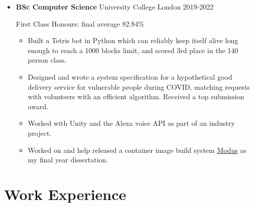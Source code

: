   \begin{itemize}
    \item \textbf{BSc Computer Science} \dashdiv{} University College London \dashdiv{} 2019-2022

      First Class Honours: final average 82.84\%

      \begin{itemize}
        \item Built a Tetris bot in Python which can reliably keep itself alive long enough to reach a 1000 blocks limit, and scored 3rd place in the 140 person class.

        \item Designed and wrote a system specification for a hypothetical good delivery service for vulnerable people during COVID, matching requests with volunteers with an efficient algorithm. Received a top submission award.

        \item Worked with Unity and the Alexa voice API as part of an industry project.

        \item Worked on and help released a container image build system \href{https://modus-continens.com/}{\color{link}Modus} as my final year dissertation.
      \end{itemize}


  \end{itemize}

  \section{Work Experience}

